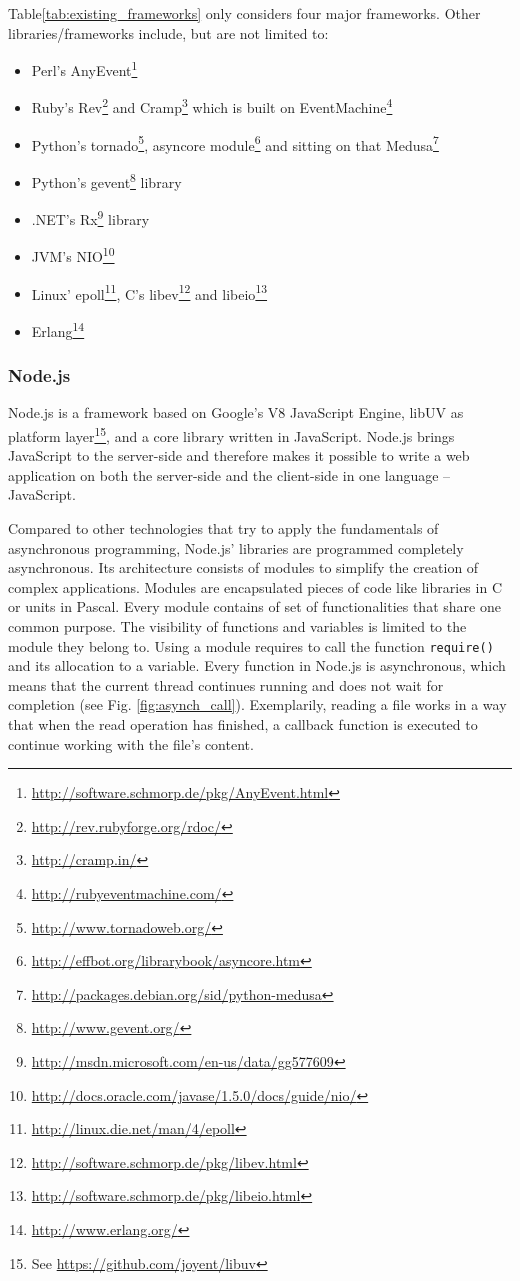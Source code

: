 Table\ref{tab:existing_frameworks} only considers four major frameworks. Other libraries/frameworks include, but are not limited to:

\begin{itemize}
  \item Perl's AnyEvent\footnote{\url{http://software.schmorp.de/pkg/AnyEvent.html}}
  \item Ruby's Rev\footnote{\url{http://rev.rubyforge.org/rdoc/}} and Cramp\footnote{\url{http://cramp.in/}} which is built on EventMachine\footnote{\url{http://rubyeventmachine.com/}}
  \item Python's tornado\footnote{\url{http://www.tornadoweb.org/}}, asyncore module\footnote{\url{http://effbot.org/librarybook/asyncore.htm}} and sitting on that Medusa\footnote{\url{http://packages.debian.org/sid/python-medusa}}
  \item Python's gevent\footnote{\url{http://www.gevent.org/}} library
  \item .NET's Rx\footnote{\url{http://msdn.microsoft.com/en-us/data/gg577609}} library
  \item JVM's NIO\footnote{\url{http://docs.oracle.com/javase/1.5.0/docs/guide/nio/}}
  \item Linux' epoll\footnote{\url{http://linux.die.net/man/4/epoll}}, C's libev\footnote{\url{http://software.schmorp.de/pkg/libev.html}} and libeio\footnote{\url{http://software.schmorp.de/pkg/libeio.html}}
  \item Erlang\footnote{\url{http://www.erlang.org/}}
\end{itemize}

\FloatBarrier

\subsubsection{Node.js}
\label{Node.js}

Node.js is a framework based on Google's V8 JavaScript Engine, libUV as platform
layer\footnote{See \url{https://github.com/joyent/libuv}}, and a core library
written in JavaScript.
Node.js brings JavaScript to the server-side and therefore makes it possible to
write a web application on both the server-side and the client-side in one
language – JavaScript.

Compared to other technologies that try to apply the fundamentals of
asynchronous programming, Node.js' libraries are programmed completely
asynchronous. Its architecture consists of modules to simplify the creation of
complex applications. Modules are encapsulated pieces of code like libraries in
C or units in Pascal. Every module contains of set of functionalities that share
one common purpose. The visibility of functions and variables is limited to the
module they belong to. Using a module requires to call the function \texttt{require()}
and its allocation to a variable.
Every function in Node.js is asynchronous, which means that the current thread
continues running and does not wait for completion (see Fig.
\ref{fig:asynch_call}). Exemplarily, reading a file works in a way that when the
read operation has finished, a callback function is executed to continue working
with the file's content.


